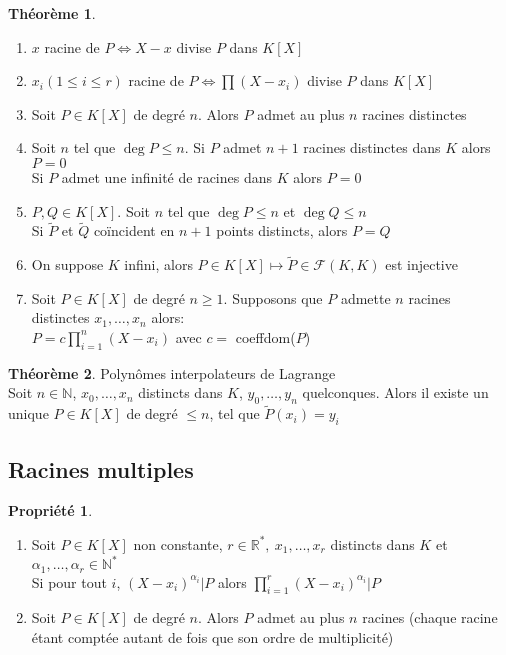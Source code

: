 \documentclass[fleqn]{article}
\theoremstyle{definition} \newtheorem*{defi}{D\'efinition}
\theoremstyle{definition} \newtheorem*{theo}{Th\'eor\`eme}
\theoremstyle{definition} \newtheorem*{coro}{Corollaire}
\theoremstyle{definition} \newtheorem*{nota}{Notation}
\theoremstyle{remark} \newtheorem*{rqs}{Remarques}
\theoremstyle{definition} \newtheorem*{prop}{Propri\'et\'e}
\begin{document}
\begin{theo} $ $
	\begin{enumerate}
		\item $x$ racine de $P \Leftrightarrow X - x$ divise $P$ dans $K[X]$
		\item $x_i (1 \leq i \leq r)$ racine de $P \Leftrightarrow \prod (X - x_i)$ divise $P$ dans $K[X]$
		\item Soit $P \in K[X]$ de degr\'e $n$. Alors $P$ admet au plus $n$ racines distinctes
		\item Soit $n$ tel que $\deg P \leq n$. Si $P$ admet $n+1$ racines distinctes dans $K$ alors $P = 0$ \\
			Si $P$ admet une infinit\'e de racines dans $K$ alors $P = 0$
		\item $P,Q \in K[X]$. Soit $n$ tel que $\deg P \leq n$ et $\deg Q \leq n$ \\
			Si $\tilde{P}$ et $\tilde{Q}$ co\"incident en $n+1$ points distincts, alors $P=Q$
		\item On suppose $K$ infini, alors $P \in K[X] \mapsto \tilde{P} \in \mathcal{F}(K,K)$ est injective
		\item Soit $P \in K[X]$ de degr\'e $n \geq 1$. Supposons que $P$ admette $n$ racines distinctes $x_1, \hdots, x_n$ alors: \\
			$P = c\prod_{i=1}^n(X-x_i)$ avec $c = $ coeffdom($P$)
	\end{enumerate}
\end{theo}

\begin{theo} Polyn\^omes interpolateurs de Lagrange \\
	Soit $n\in \mathbb{N}$, $x_0, \hdots, x_n$ distincts dans $K$, $y_0, \hdots, y_n$ quelconques. Alors il existe un unique $P \in K[X]$
	de degr\'e $\leq n$, tel que $\tilde{P}(x_i) = y_i$
\end{theo}

\subsection{Racines multiples}

\begin{prop} $ $
	\begin{enumerate}
		\item Soit $P \in K[X]$ non constante, $r \in \mathbb{R}^*,\ x_1, \hdots, x_r$ distincts dans $K$ et $\alpha_1, \hdots, \alpha_r \in
		\mathbb{N}^*$\\
		Si pour tout $i$, $(X-x_i)^{\alpha_i} | P$ alors $\prod_{i=1}^r (X - x_i)^{\alpha_i} | P$
		\item Soit $P\in K[X]$ de degr\'e $n$. Alors $P$ admet au plus $n$ racines (chaque racine \'etant compt\'ee autant de fois que son ordre
		de multiplicit\'e)
	\end{enumerate}
\end{prop}
\end{document}
